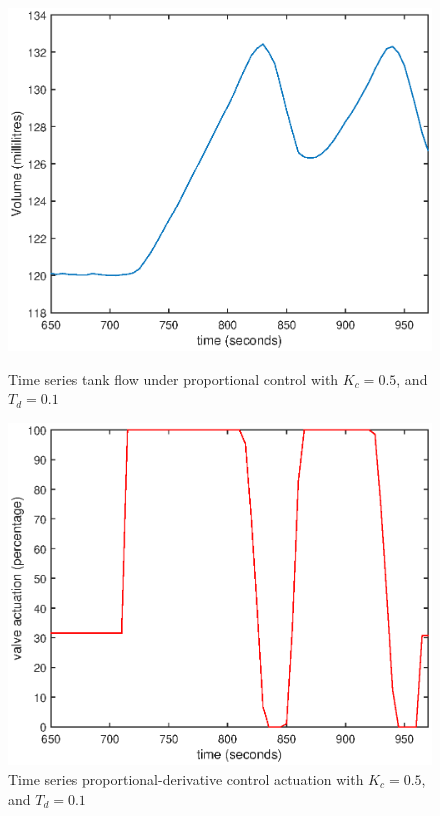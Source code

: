 \documentclass{article}
\begin{document}
\begin{figure}[h]
	\centering
	\begin{minipage}{0.45\textwidth}
		\centering
		\includegraphics[scale=0.4]{PD_Kc_05_Td_03}
		\caption{Time series tank flow under proportional control with $K_c = 0.5$, and $T_d = 0.1$}
	\end{minipage}
	\hspace{0.5cm}
	\begin{minipage}{0.45\textwidth}
		\centering
		\includegraphics[scale=0.4]{PD_Kc_05_Td_03_control}
		\caption{Time series proportional-derivative control actuation with $K_c = 0.5$, and $T_d = 0.1$}
	\end{minipage}
\end{figure}
\end{document}
